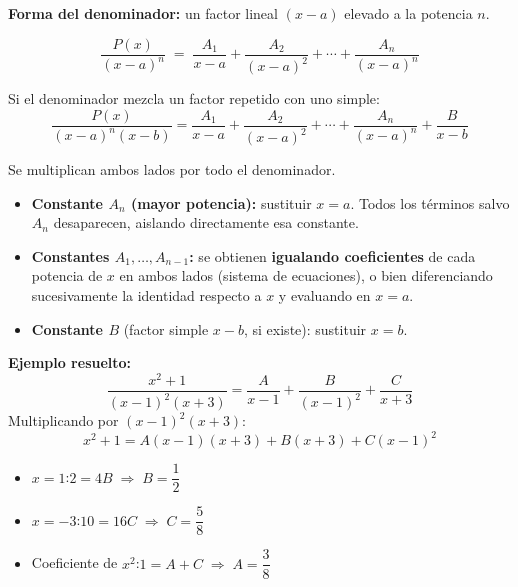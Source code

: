 \documentclass[12pt, letterpaper]{article}
\newenvironment{caso2}{%
  \begin{tcolorbox}[casobase, colframe=verde, colbacktitle=verdeclaro, coltitle=verdetitulo,
    title=Caso 2 \textnormal{---} Factores lineales repetidos]
}{\end{tcolorbox}}
\newenvironment{metodocuadro}[1]{%
  \begin{tcolorbox}[subcuadro, colback=coralclaro, colframe=coral,
    coltitle=coraltitulo, colbacktitle=coralclaro,
    title={#1}]
}{\end{tcolorbox}}
\begin{document}
\vspace{0.4cm}

\begin{caso2}

\textbf{Forma del denominador:} un factor lineal $(x-a)$ elevado a la potencia $n$.

\[
  \frac{P(x)}{(x-a)^n}
  \;=\; \frac{A_1}{x-a} + \frac{A_2}{(x-a)^2} + \cdots + \frac{A_n}{(x-a)^n}
\]

Si el denominador mezcla un factor repetido con uno simple:
\[
  \frac{P(x)}{(x-a)^n(x-b)}
  = \frac{A_1}{x-a} + \frac{A_2}{(x-a)^2} + \cdots + \frac{A_n}{(x-a)^n} + \frac{B}{x-b}
\]

\begin{metodocuadro}{C\'{o}mo hallar las constantes --- Caso 2}
Se multiplican ambos lados por todo el denominador.

\begin{itemize}[leftmargin=2em]
  \item \textbf{Constante $A_n$ (mayor potencia):} sustituir $x = a$. Todos los t\'{e}rminos
        salvo $A_n$ desaparecen, aislando directamente esa constante.
  \item \textbf{Constantes $A_1, \ldots, A_{n-1}$:} se obtienen \textbf{igualando coeficientes}
        de cada potencia de $x$ en ambos lados (sistema de ecuaciones), o bien
        diferenciando sucesivamente la identidad respecto a $x$ y evaluando en $x = a$.
  \item \textbf{Constante $B$} (factor simple $x-b$, si existe): sustituir $x = b$.
\end{itemize}
\end{metodocuadro}

\medskip
\textbf{Ejemplo resuelto:}
\[
  \frac{x^2 + 1}{(x-1)^2(x+3)} = \frac{A}{x-1} + \frac{B}{(x-1)^2} + \frac{C}{x+3}
\]
Multiplicando por $(x-1)^2(x+3)$:
\[
  x^2+1 = A(x-1)(x+3) + B(x+3) + C(x-1)^2
\]
\begin{itemize}[leftmargin=2em]
  \item $x = 1$:\quad $2 = 4B \;\Rightarrow\; B = \dfrac{1}{2}$
  \item $x = -3$:\quad $10 = 16C \;\Rightarrow\; C = \dfrac{5}{8}$
  \item Coeficiente de $x^2$:\quad $1 = A + C \;\Rightarrow\; A = \dfrac{3}{8}$
\end{itemize}

\end{caso2}
\end{document}
